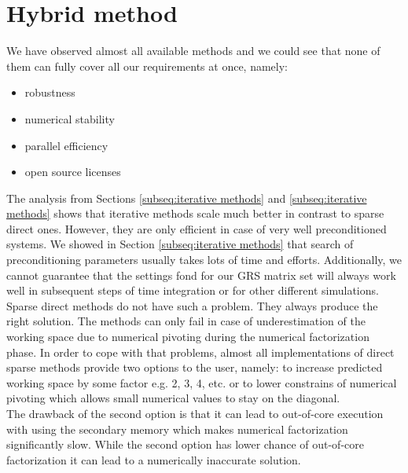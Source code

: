 \section{Hybrid method}
\label{subseq:hybrid-method-description}


We have observed almost all available methods and we could see that none of them can fully cover all our requirements at once, namely:

\begin{itemize}
	\item robustness
	\item numerical stability
	\item parallel efficiency
	\item open source licenses
\end{itemize}


The analysis from Sections \ref{subseq:iterative methods} and \ref{subseq:iterative methods} shows that iterative methods scale much better in contrast to sparse direct ones. However, they are only efficient in case of very well preconditioned systems. We showed in Section \ref{subseq:iterative methods} that search of preconditioning parameters usually takes lots of time and efforts. Additionally, we cannot guarantee that the settings fond for our GRS matrix set will always work well in subsequent steps of time integration or for other different simulations.\\


Sparse direct methods do not have such a problem. They always produce the right solution. The methods can only fail in case of underestimation of the working space due to numerical pivoting during the numerical factorization phase. In order to cope with that problems, almost all implementations of direct sparse methods provide two options to the user, namely: to increase predicted working space by some factor e.g. 2, 3, 4, etc. or to lower constrains of numerical pivoting which allows small numerical values to stay on the diagonal.\\


The drawback of the second option is that it can lead to out-of-core execution with using the secondary memory which makes numerical factorization significantly slow. While the second option has lower chance of out-of-core factorization it can lead to a numerically inaccurate solution. \\


